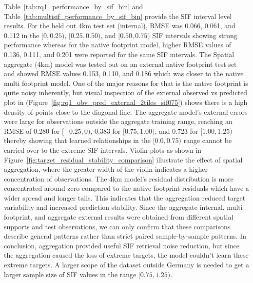 Table~\ref{tab:rq1_performance_by_sif_bin} and Table~\ref{tab:multisif_performance_by_sif_bin} provide the SIF interval level results. For the held out 4km test set (internal), RMSE was 0.066, 0.061, and 0.112 in the $[0,0.25)$, $[0.25,0.50)$, and $[0.50,0.75)$ SIF intervals showing strong performance whereas for the native footprint model, higher RMSE values of 0.136, 0.111, and 0.201 were reported for the same SIF intervals. The Spatial aggregate (4km) model was tested out on an external native footprint test set and showed RMSE values 0.153, 0.110, and 0.186 which was closer to the native multi footprint model. One of the major reasons for that is the native footprint is quite noisy inherently, but visual inspection of the external observed vs predicted plot in (Figure~\ref{fig:rq1_obv_pred_external_2tiles_sif075}) shows there is a high density of points close to the diagonal line. The aggregate model's external errors were large for observations outside the aggregate training range, reaching an RMSE of 0.280 for $[-0.25,0)$, 0.383 for $[0.75,1.00)$, and 0.723 for $[1.00,1.25)$ thereby showing that learned relationships in the $[0.0,0.75)$ range cannot be carried over to the extreme SIF intervals. Violin plots as shown in Figure~\ref{fig:target_residual_stability_comparison} illustrate the effect of spatial aggregation, where the greater width of the violin indicates a higher concentration of observations. The 4km model's residual distribution is more concentrated around zero compared to the native footprint residuals which have a wider spread and longer tails. This indicates that the aggregation reduced target variability and increased prediction stability. Since the aggregate internal, multi footprint, and aggregate external results were obtained from different spatial supports and test observations, we can only confirm that these comparisons describe general patterns rather than strict paired sample-by-sample patterns. In conclusion, aggregation provided useful SIF retrieval noise reduction, but since the aggregation caused the loss of extreme targets, the model couldn't learn these extreme targets. A larger scope of the dataset outside Germany is needed to get a larger sample size of SIF values in the range $[0.75,1.25)$.

